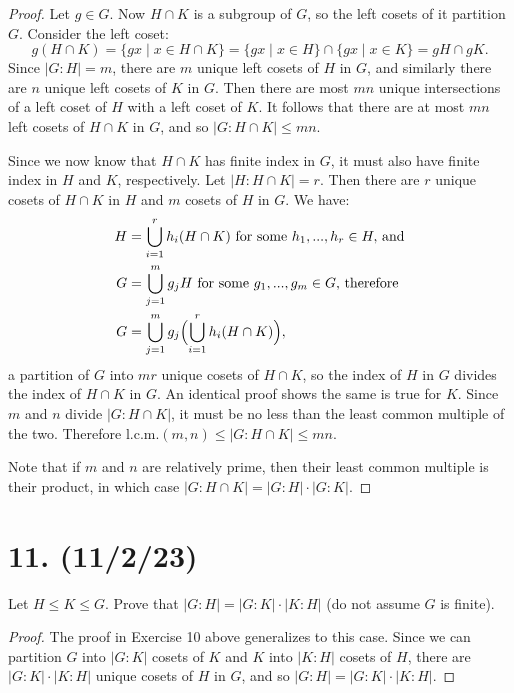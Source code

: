 \documentclass{article}
\begin{document}
\begin{proof}
    Let $g \in G$. Now $H \cap K$ is a subgroup of $G$, so the left cosets of it partition $G$. Consider the left coset:
    \begin{equation*}
        g(H \cap K) = \{ gx \mid x \in H \cap K \} = \{ gx \mid x \in H \} \cap \{ gx \mid x \in K \} = gH \cap gK. 
    \end{equation*}
    Since $|G:H| = m$, there are $m$ unique left cosets of $H$ in $G$, and similarly there are $n$ unique left cosets of $K$ in $G$. Then there are most $mn$ unique intersections of a left coset of $H$ with a left coset of $K$. It follows that there are at most $mn$ left cosets of $H \cap K$ in $G$, and so $|G : H \cap K| \leq mn$.

    Since we now know that $H \cap K$ has finite index in $G$, it must also have finite index in $H$ and $K$, respectively. Let $|H : H \cap K| = r$. Then there are $r$ unique cosets of $H \cap K$ in $H$ and $m$ cosets of $H$ in $G$. We have:
    \begin{align*}
        H &= \bigcup_{i = 1}^r h_i(H \cap K) \text{ for some $h_1, ..., h_r \in H,$ and} \\
        G &= \bigcup_{j = 1}^m g_j H \text{ for some $g_1, ..., g_m \in G$, therefore} \\
        G &= \bigcup_{j = 1}^m g_j \Bigl( \bigcup_{i = 1}^r h_i (H \cap K) \Bigr),
    \end{align*}
    a partition of $G$ into $mr$ unique cosets of $H \cap K$, so the index of $H$ in $G$ divides the index of $H \cap K$ in $G$. An identical proof shows the same is true for $K$. Since $m$ and $n$ divide $|G : H \cap K|$, it must be no less than the least common multiple of the two. Therefore l.c.m.$(m, n) \leq |G : H \cap K| \leq mn$.

    Note that if $m$ and $n$ are relatively prime, then their least common multiple is their product, in which case $|G : H \cap K| = |G : H| \cdot |G : K|$.
\end{proof}

\section*{11. (11/2/23)}

Let $H \leq K \leq G$. Prove that $|G:H| = |G:K| \cdot |K:H|$ (do not assume $G$ is finite).

\begin{proof}
    The proof in Exercise 10 above generalizes to this case. Since we can partition $G$ into $|G:K|$ cosets of $K$ and $K$ into $|K:H|$ cosets of $H$, there are $|G:K| \cdot |K:H|$ unique cosets of $H$ in $G$, and so $|G:H| = |G:K| \cdot |K:H|$.
\end{proof}
\end{document}
